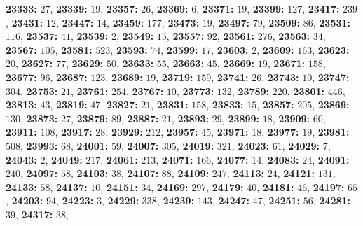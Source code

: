 \textsf{\bfseries 23333:} $27$, \textsf{\bfseries 23339:} $19$, \textsf{\bfseries 23357:} $26$, \textsf{\bfseries 23369:} $6$, \textsf{\bfseries 23371:} $19$, \textsf{\bfseries 23399:} $127$, \textsf{\bfseries 23417:} $239$, \textsf{\bfseries 23431:} $12$, \textsf{\bfseries 23447:} $14$, \textsf{\bfseries 23459:} $177$, \textsf{\bfseries 23473:} $19$, \textsf{\bfseries 23497:} $79$, \textsf{\bfseries 23509:} $86$, \textsf{\bfseries 23531:} $116$, \textsf{\bfseries 23537:} $41$, \textsf{\bfseries 23539:} $2$, \textsf{\bfseries 23549:} $15$, \textsf{\bfseries 23557:} $92$, \textsf{\bfseries 23561:} $276$, \textsf{\bfseries 23563:} $34$, \textsf{\bfseries 23567:} $105$, \textsf{\bfseries 23581:} $523$, \textsf{\bfseries 23593:} $74$, \textsf{\bfseries 23599:} $17$, \textsf{\bfseries 23603:} $2$, \textsf{\bfseries 23609:} $163$, \textsf{\bfseries 23623:} $20$, \textsf{\bfseries 23627:} $77$, \textsf{\bfseries 23629:} $50$, \textsf{\bfseries 23633:} $55$, \textsf{\bfseries 23663:} $45$, \textsf{\bfseries 23669:} $19$, \textsf{\bfseries 23671:} $158$, \textsf{\bfseries 23677:} $96$, \textsf{\bfseries 23687:} $123$, \textsf{\bfseries 23689:} $19$, \textsf{\bfseries 23719:} $159$, \textsf{\bfseries 23741:} $26$, \textsf{\bfseries 23743:} $10$, \textsf{\bfseries 23747:} $304$, \textsf{\bfseries 23753:} $21$, \textsf{\bfseries 23761:} $254$, \textsf{\bfseries 23767:} $10$, \textsf{\bfseries 23773:} $132$, \textsf{\bfseries 23789:} $220$, \textsf{\bfseries 23801:} $446$, \textsf{\bfseries 23813:} $43$, \textsf{\bfseries 23819:} $47$, \textsf{\bfseries 23827:} $21$, \textsf{\bfseries 23831:} $158$, \textsf{\bfseries 23833:} $15$, \textsf{\bfseries 23857:} $205$, \textsf{\bfseries 23869:} $130$, \textsf{\bfseries 23873:} $27$, \textsf{\bfseries 23879:} $89$, \textsf{\bfseries 23887:} $21$, \textsf{\bfseries 23893:} $29$, \textsf{\bfseries 23899:} $18$, \textsf{\bfseries 23909:} $60$, \textsf{\bfseries 23911:} $108$, \textsf{\bfseries 23917:} $28$, \textsf{\bfseries 23929:} $212$, \textsf{\bfseries 23957:} $45$, \textsf{\bfseries 23971:} $18$, \textsf{\bfseries 23977:} $19$, \textsf{\bfseries 23981:} $508$, \textsf{\bfseries 23993:} $68$, \textsf{\bfseries 24001:} $59$, \textsf{\bfseries 24007:} $305$, \textsf{\bfseries 24019:} $321$, \textsf{\bfseries 24023:} $61$, \textsf{\bfseries 24029:} $7$, \textsf{\bfseries 24043:} $2$, \textsf{\bfseries 24049:} $217$, \textsf{\bfseries 24061:} $213$, \textsf{\bfseries 24071:} $166$, \textsf{\bfseries 24077:} $14$, \textsf{\bfseries 24083:} $24$, \textsf{\bfseries 24091:} $240$, \textsf{\bfseries 24097:} $58$, \textsf{\bfseries 24103:} $38$, \textsf{\bfseries 24107:} $88$, \textsf{\bfseries 24109:} $247$, \textsf{\bfseries 24113:} $24$, \textsf{\bfseries 24121:} $131$, \textsf{\bfseries 24133:} $58$, \textsf{\bfseries 24137:} $10$, \textsf{\bfseries 24151:} $34$, \textsf{\bfseries 24169:} $297$, \textsf{\bfseries 24179:} $40$, \textsf{\bfseries 24181:} $46$, \textsf{\bfseries 24197:} $65$, \textsf{\bfseries 24203:} $94$, \textsf{\bfseries 24223:} $3$, \textsf{\bfseries 24229:} $338$, \textsf{\bfseries 24239:} $143$, \textsf{\bfseries 24247:} $47$, \textsf{\bfseries 24251:} $56$, \textsf{\bfseries 24281:} $39$, \textsf{\bfseries 24317:} $38$, 
